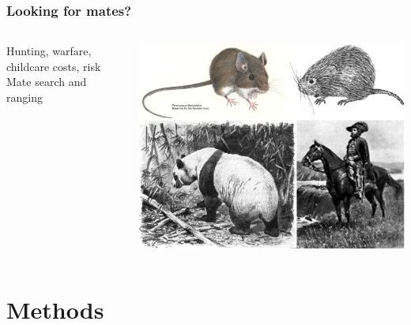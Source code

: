 \documentclass{beamer}
\begin{document}
\begin{frame}
\frametitle{Looking for mates? }

\begin{columns}
\begin{column}{.5\textwidth}

Hunting, warfare, childcare costs, risk \\
\vspace{0.75cm}
Mate search and ranging \\

\end{column}

\begin{column}{.5\textwidth}
\includegraphics[width= 1\textwidth]{dimorph}
\end{column}

\end{columns}

\end{frame}


\section{Methods}

\end{document}
